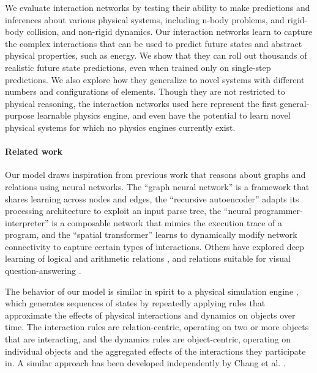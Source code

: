 \documentclass{article}
\begin{document}
We evaluate interaction networks by testing their ability to make
predictions and inferences about various physical systems, including
n-body problems, and rigid-body collision, and non-rigid dynamics. Our
interaction networks learn to capture the complex interactions that
can be used to predict future states and abstract physical properties,
such as energy. We show that they can roll out thousands of realistic
future state predictions, even when trained only on single-step
predictions. We also explore how they generalize to novel systems with
different numbers and configurations of elements. Though they are not
restricted to physical reasoning, the interaction networks used here
represent the first general-purpose learnable physics engine, and even
have the potential to learn novel physical systems for which no
physics engines currently exist.

\paragraph{Related work}
Our model draws inspiration from previous work that reasons about
graphs and relations using neural networks. The ``graph neural
network'' \cite{scarselli09graphnet,li2015gated} is a framework that
shares learning across nodes and edges, the ``recursive autoencoder''
\cite{socher2011dynamic} adapts its processing architecture to exploit
an input parse tree, the ``neural programmer-interpreter''
\cite{reed2016npi} is a composable network that mimics the execution
trace of a program, and the ``spatial transformer''
\cite{jaderberg2015spatial} learns to dynamically modify network
connectivity to capture certain types of interactions. Others have
explored deep learning of logical and arithmetic relations
\cite{sutskever2009sym}, and relations suitable for visual
question-answering \cite{andreas2016qa}.

The behavior of our model is similar in spirit to a physical
simulation engine \cite{baraff2001physically}, which generates
sequences of states by repeatedly applying rules that approximate the
effects of physical interactions and dynamics on objects over
time. The interaction rules are relation-centric, operating on two or
more objects that are interacting, and the dynamics rules are
object-centric, operating on individual objects and the aggregated
effects of the interactions they participate in. A similar approach
has been developed independently by Chang et
al. \cite{chang2016compositional}.
\end{document}
